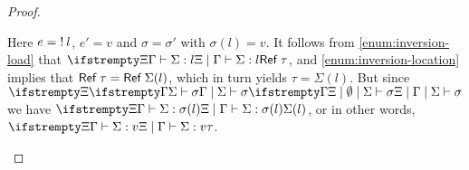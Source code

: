 \begin{proof}
\begin{proofsec}
    \item[\ruleref{Eload}]
    Here $e = \mathsf{!}\: l$, $e' = v$ and $\sigma = \sigma'$ with $\sigma(l) = v$. It follows from \cref{enum:inversion-load} that $\typerel{\Xi}{\Gamma}{\Sigma}{l}{\typeRef{\tau}}$, and \cref{enum:inversion-location} implies that $\mathsf{Ref}\:\tau = \mathsf{Ref}\:\Sigma(l)$, which in turn yields $\tau = \Sigma(l)$. But since $\stotype{\Xi}{\Gamma}{\Sigma}{\sigma}$ we have $\typerel{\Xi}{\Gamma}{\Sigma}{\sigma(l)}{\Sigma(l)}$, or in other words, $\typerel{\Xi}{\Gamma}{\Sigma}{v}{\tau}$.
\end{proofsec}
\end{proof}
